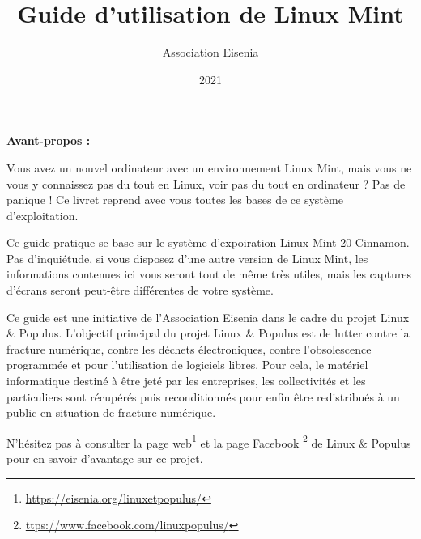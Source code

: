 \documentclass[12pt]{book}
\title{Guide d'utilisation de Linux Mint}
\author{Association Eisenia}
\date{2021}
\begin{document}
\renewcommand{\contentsname}{Table des matières}
\renewcommand{\tablename}{\textsc{Tableau}}
\renewcommand{\figurename}{\textsc{Capture d'écran}}
\renewcommand{\chaptername}{Chapitre}

\newpage
	\begin{center}
		\textbf{Avant-propos :}
	\end{center}\par
	Vous avez un nouvel ordinateur avec un environnement Linux Mint, mais vous ne vous y connaissez pas du tout en Linux, voir pas du tout en ordinateur ?
	Pas de panique ! 
	Ce livret reprend avec vous toutes les bases de ce système d'exploitation.\par
	Ce guide pratique se base sur le système d'expoiration Linux Mint 20 Cinnamon.
	Pas d'inquiétude, si vous disposez d'une autre version de Linux Mint, les informations contenues ici vous seront tout de même très utiles, mais les captures d'écrans seront peut-être différentes de votre système.\par
	\medskip
	Ce guide est une initiative de l'Association Eisenia dans le cadre du projet Linux \& Populus.
	L'objectif principal du projet Linux \& Populus est de lutter contre la fracture numérique, contre les déchets électroniques, contre l'obsolescence programmée et pour l'utilisation de logiciels libres.
	Pour cela, le matériel informatique destiné à être jeté par les entreprises, les collectivités et les particuliers sont récupérés puis reconditionnés pour enfin être redistribués à un public en situation de fracture numérique.\par
	N'hésitez pas à consulter la page web\footnote{\href{https://eisenia.org/linuxetpopulus/}{https://eisenia.org/linuxetpopulus/}} et la page Facebook \footnote{\href{https://www.facebook.com/linuxpopulus/}{ttps://www.facebook.com/linuxpopulus/}} de Linux \& Populus pour en savoir d'avantage sur ce projet.

\newpage
\tableofcontents
\end{document}
